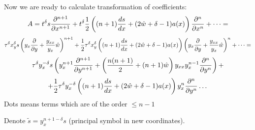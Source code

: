           Now we are ready to calculate transformation of coefficients:
                  $$
                  A=t^\delta
    s{\partial ^{n+1}\over \partial x^{n+1}}
        +t^\delta{1\over 2}
        \left(
        (n+1){ds\over dx}+
        (2\hat w+\delta-1)a(x)
               \right) {\partial^{n}\over \partial x^{n}}+
            \dots=
                  $$
                  $$
                  \tau^\delta x_y^\delta
                           s
    \left(y_x {\partial\over \partial y}+{y_{xx}\over y_x}\hat w\right)^{n+1}
        +{1\over 2}
        \tau^\delta x_y^\delta
        \left(
        (n+1){ds\over dx}+
        (2\hat w+\delta-1)a(x)
               \right) \left(y_x {\partial\over \partial y}+{y_{xx}\over y_x}\hat w\right)^n+
            \dots=
                  $$
                  $$
                 \tau^\delta y_x^{-\delta}
                           s
                          \left(
                          y_x^{n+1}{\partial ^{n+1}\over \partial y^{n+1}}+
                          \left({n(n+1)\over 2}+(n+1)\hat w\right)y_{xx}y^{n-1}_x
                          {\partial ^{n}\over \partial y^{n}}
                          \right)
        +
        $$
        $$
        +{1\over 2}
        \tau^\delta y_x^{-\delta}
        \left(
        (n+1){ds\over dx}+
        (2\hat w+\delta-1)a(x)
               \right)
               y^n_x {\partial^n\over \partial y^n}
            \dots
                  $$
Dots means terms which are of the order $\leq n-1$

Denote $\tilde s=y_x^{n+1-\delta}s$ (principal symbol in new coordinates).

